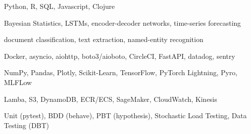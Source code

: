 \begin{cvskills}

	{Python, R, SQL, Javascript, Clojure}

	{Bayesian Statistics, LSTMs, encoder-decoder networks, time-series forecasting}

        {document classification, text extraction, named-entity recognition}

	{Docker, asyncio, aiohttp, boto3/aioboto, CircleCI, FastAPI, datadog, sentry}

	{NumPy, Pandas, Plotly, Scikit-Learn, TensorFlow, PyTorch Lightning, Pyro, MLFLow}

	{Lamba, S3, DynamoDB, ECR/ECS, SageMaker, CloudWatch, Kinesis}
        
        {Unit (pytest), BDD (behave), PBT (hypothesis), Stochastic Load Testing, Data Testing (DBT)}

\end{cvskills}
